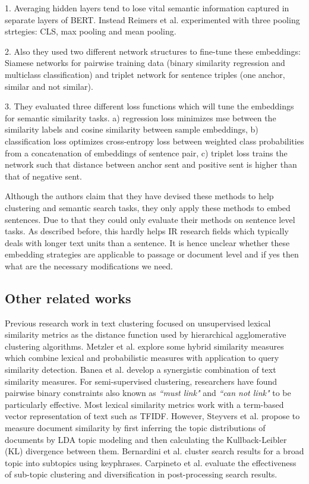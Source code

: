 \documentclass[sigconf,authordraft]{acmart}
\begin{document}
1. Averaging hidden layers tend to lose vital semantic information captured in separate layers of BERT. Instead Reimers et al. experimented with three pooling strtegies: CLS, max pooling and mean pooling. 

2. Also they used two different network structures to fine-tune these embeddings: Siamese networks for pairwise training data (binary similarity regression and multiclass classification) and triplet network for sentence triples (one anchor, similar and not similar).

3. They evaluated three different loss functions which will tune the embeddings for semantic similarity tasks. a) regression loss minimizes mse between the similarity labels and cosine similarity between sample embeddings, b) classification loss optimizes cross-entropy loss between weighted class probabilities from a concatenation of embeddings of sentence pair, c) triplet loss trains the network such that distance between anchor sent and positive sent is higher than that of negative sent.

Although the authors claim that they have devised these methods to help clustering and semantic search tasks, they only apply these methods to embed sentences. Due to that they could only evaluate their methods on sentence level tasks. As described before, this hardly helps IR research fields which typically deals with longer text units than a sentence. It is hence unclear whether these embedding strategies are applicable to passage or document level and if yes then what are the necessary modifications we need.

\subsection{Other related works} Previous research work in text clustering\cite{kulis2009semi,bilenko2004integrating,davidson2008finding,basu2004probabilistic,basu2002semi,gomaa2013survey} focused on unsupervised lexical similarity metrics as the distance function used by hierarchical agglomerative clustering algorithms. Metzler et al.\cite{metzler2007similarity} explore some hybrid similarity measures which combine lexical and probabilistic measures with application to query similarity detection. Banea et al.\cite{banea2012unt} develop a synergistic combination of text similarity measures. For semi-supervised clustering, researchers have found pairwise binary constraints also known as \textit{``must link"} and \textit{``can not link"} to be particularly effective. Most lexical similarity metrics work with a term-based vector representation of text such as TFIDF. However, Steyvers et al.\cite{steyvers2007probabilistic} propose to measure document similarity by first inferring the topic distributions of documents by LDA\cite{blei2003latent} topic modeling and then calculating the Kullback-Leibler (KL) divergence between them. Bernardini et al. \cite{bernardini2009full} cluster search results for a broad topic into subtopics using keyphrases. Carpineto et al. \cite{carpineto2012evaluating} evaluate the effectiveness of sub-topic clustering and diversification in post-processing search results.
\end{document}
